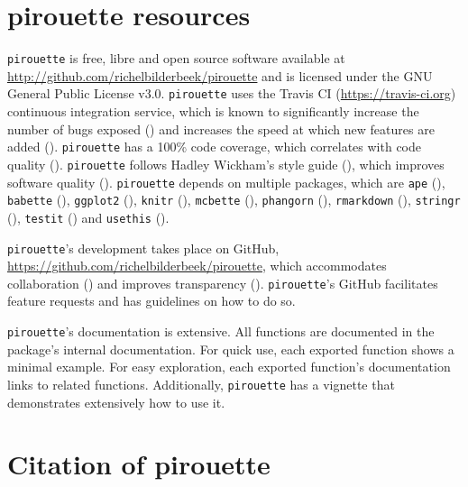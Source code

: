 \documentclass{article}
\begin{document}
\section{pirouette resources}

\verb;pirouette; is free, libre and open source software available at 
\url{http://github.com/richelbilderbeek/pirouette}
and is licensed under the GNU General Public License v3.0.
\verb;pirouette; uses the Travis CI (\url{https://travis-ci.org})
continuous integration service, which is known to significantly 
increase the number of bugs exposed (\cite{vasilescu2015}) and increases
the speed at which new features are added (\cite{vasilescu2015}).
\verb;pirouette; has a 100\% code coverage, which correlates with 
code quality (\cite{horgan1994,del1995correlation}). 
\verb;pirouette; follows Hadley Wickham's style guide (\cite{style_guide}), 
which improves software quality (\cite{fang2001}).
\verb;pirouette; depends on multiple packages, which are 
\verb;ape; (\cite{APE}), 
\verb;babette; (\cite{bilderbeek2018babette}),
\verb;ggplot2; (\cite{ggplot2}),
\verb;knitr; (\cite{knitr}),
\verb;mcbette; (\cite{mcbette}),
\verb;phangorn; (\cite{phangorn}),
\verb;rmarkdown; (\cite{rmarkdown}),
\verb;stringr; (\cite{stringr}),
\verb;testit; (\cite{testit}) and 
\verb;usethis; (\cite{usethis}).

\verb;pirouette;'s development takes place on GitHub,
\url{https://github.com/richelbilderbeek/pirouette}, 
which accommodates collaboration (\cite{perez2016ten}) 
and improves transparency (\cite{gorgolewski2016practical}).
\verb;pirouette;'s GitHub facilitates feature requests and 
has guidelines on how to do so.

\verb;pirouette;'s documentation is extensive. All functions are documented
in the package's internal documentation. For quick use, 
each exported function shows a minimal example. 
For easy exploration, each exported function's documentation links to related functions.
Additionally, \verb;pirouette; has a vignette that demonstrates extensively how
to use it. 

\section{Citation of pirouette}
\end{document}
